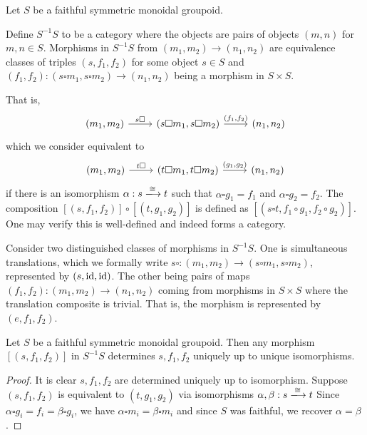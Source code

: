 Let $S$ be a faithful symmetric monoidal groupoid.

\begin{definition}[$S^{-1}S$]
Define $S^{-1}S$ to be a category where the objects are pairs of objects $(m,n)$ for $m, n \in S$.
Morphisms in $S^{-1}S$ from $(m_1,m_2) \to (n_1,n_2)$ are equivalence classes of triples $(s,f_1,f_2)$ for some object $s \in S$ and
$(f_1,f_2) : (s \square m_1, s \square m_2) \to (n_1,n_2)$ being a morphism in $S \times S$.

That is,
\[
\begin{tikzcd}
(m_1,m_2) \arrow[r, "s\square"] & (s\square m_1, s \square m_2) \arrow[r, "(f_1{,}f_2)"] & (n_1, n_2)
\end{tikzcd}
\]
which we consider equivalent to
\[
\begin{tikzcd}
(m_1,m_2) \arrow[r, "t\square"] & (t\square m_1, t \square m_2) \arrow[r, "(g_1{,}g_2)"] & (n_1, n_2)
\end{tikzcd}
\]
if there is an isomorphism $\alpha : s \xlongrightarrow{\cong} t$ such that $\alpha \square g_1 = f_1$ and $\alpha \square g_2 = f_2$.
The composition $[(s,f_1,f_2)]\circ[(t,g_1,g_2)]$ is defined as $[(s \square t, f_1 \circ g_1, f_2 \circ g_2)]$.
One may verify this is well-defined and indeed forms a category.
\end{definition}

\begin{remark}
Consider two distinguished classes of morphisms in $S^{-1}S$.
One is simultaneous translations, which we formally write $s \square : (m_1,m_2) \to (s\square m_1, s \square m_2)$, represented by $(s,\operatorname*{id},\operatorname*{id})$.
The other being pairs of maps $(f_1, f_2) : (m_1, m_2) \to (n_1, n_2)$ coming from morphisms in $S \times S$ where the translation composite is trivial.
That is, the morphism is represented by $(e, f_1, f_2)$.
\end{remark}

\begin{proposition}
Let $S$ be a faithful symmetric monoidal groupoid. Then any morphism $[(s,f_1,f_2)]$ in $S^{-1}S$
determines $s, f_1, f_2$ uniquely up to unique isomorphisms.
\end{proposition}
\begin{proof}
It is clear $s, f_1, f_2$ are determined uniquely up to isomorphism.
Suppose $(s,f_1,f_2)$ is equivalent to $(t,g_1,g_2)$ via isomorphisms $\alpha, \beta : s \xlongrightarrow{\cong} t$
Since $\alpha \square g_i = f_i = \beta \square g_i$,
we have $\alpha \square m_i = \beta \square m_i$ and since $S$ was faithful, we recover $\alpha = \beta$.
\end{proof}

